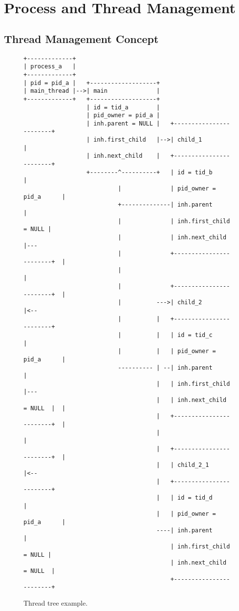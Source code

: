 \part{Process and Thread Management}

\chapter{Thread Management Concept}

\begin{figure}
\begin{verbatim}
+-------------+
| process_a   |
+-------------+
| pid = pid_a |   +-------------------+
| main_thread |-->| main              |
+-------------+   +-------------------+
                  | id = tid_a        |
                  | pid_owner = pid_a |
                  | inh.parent = NULL |   +------------------------+
                  | inh.first_child   |-->| child_1                |
                  | inh.next_child    |   +------------------------+
                  +--------^----------+   | id = tid_b             |
                           |              | pid_owner = pid_a      |
                           +--------------| inh.parent             |
                           |              | inh.first_child = NULL |
                           |              | inh.next_child         |---
                           |              +------------------------+  |
                           |                                          |
                           |              +------------------------+  |
                           |          --->| child_2                |<--
                           |          |   +------------------------+
                           |          |   | id = tid_c             |
                           |          |   | pid_owner = pid_a      |
                           ---------- | --| inh.parent             |
                                      |   | inh.first_child        |---
                                      |   | inh.next_child = NULL  |  |
                                      |   +------------------------+  |
                                      |                               |
                                      |   +------------------------+  |
                                      |   | child_2_1              |<--
                                      |   +------------------------+
                                      |   | id = tid_d             |
                                      |   | pid_owner = pid_a      |
                                      ----| inh.parent             |
                                          | inh.first_child = NULL |
                                          | inh.next_child = NULL  |
                                          +------------------------+
\end{verbatim}
\caption{Thread tree example.}
\label{figure:thtree}
\end{figure}

